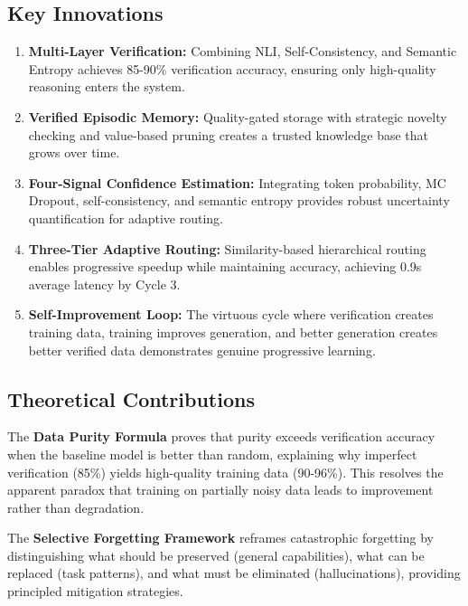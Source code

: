 \documentclass[12pt,a4paper]{article}
\theoremstyle{definition}
\begin{document}
\subsection{Key Innovations}

\begin{enumerate}
    \item \textbf{Multi-Layer Verification:} Combining NLI, Self-Consistency, and Semantic Entropy achieves 85-90\% verification accuracy, ensuring only high-quality reasoning enters the system.
    
    \item \textbf{Verified Episodic Memory:} Quality-gated storage with strategic novelty checking and value-based pruning creates a trusted knowledge base that grows over time.
    
    \item \textbf{Four-Signal Confidence Estimation:} Integrating token probability, MC Dropout, self-consistency, and semantic entropy provides robust uncertainty quantification for adaptive routing.
    
    \item \textbf{Three-Tier Adaptive Routing:} Similarity-based hierarchical routing enables progressive speedup while maintaining accuracy, achieving 0.9s average latency by Cycle 3.
    
    \item \textbf{Self-Improvement Loop:} The virtuous cycle where verification creates training data, training improves generation, and better generation creates better verified data demonstrates genuine progressive learning.
\end{enumerate}

\subsection{Theoretical Contributions}

The \textbf{Data Purity Formula} proves that purity exceeds verification accuracy when the baseline model is better than random, explaining why imperfect verification (85\%) yields high-quality training data (90-96\%). This resolves the apparent paradox that training on partially noisy data leads to improvement rather than degradation.

The \textbf{Selective Forgetting Framework} reframes catastrophic forgetting by distinguishing what should be preserved (general capabilities), what can be replaced (task patterns), and what must be eliminated (hallucinations), providing principled mitigation strategies.
\end{document}
